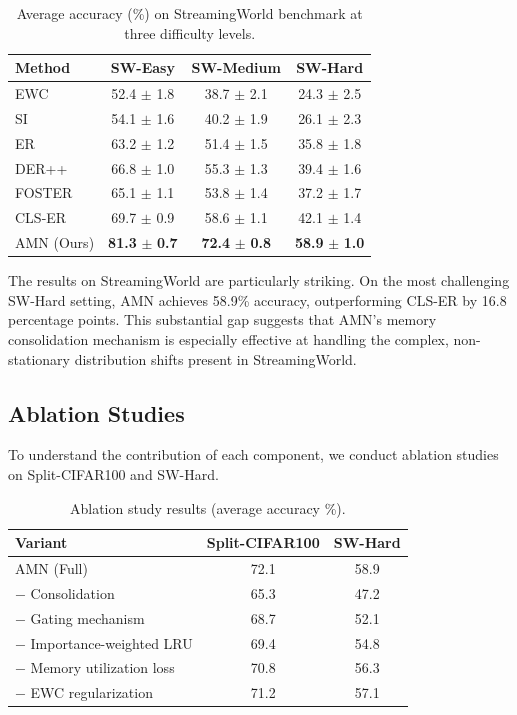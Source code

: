 \documentclass[11pt]{article}
\begin{document}
\begin{table}[h]
\centering
\caption{Average accuracy (\%) on StreamingWorld benchmark at three difficulty levels.}
\label{tab:streaming}
\begin{tabular}{lccc}
\hline
Method & SW-Easy & SW-Medium & SW-Hard \\
\hline
EWC & 52.4 $\pm$ 1.8 & 38.7 $\pm$ 2.1 & 24.3 $\pm$ 2.5 \\
SI & 54.1 $\pm$ 1.6 & 40.2 $\pm$ 1.9 & 26.1 $\pm$ 2.3 \\
ER & 63.2 $\pm$ 1.2 & 51.4 $\pm$ 1.5 & 35.8 $\pm$ 1.8 \\
DER++ & 66.8 $\pm$ 1.0 & 55.3 $\pm$ 1.3 & 39.4 $\pm$ 1.6 \\
FOSTER & 65.1 $\pm$ 1.1 & 53.8 $\pm$ 1.4 & 37.2 $\pm$ 1.7 \\
CLS-ER & 69.7 $\pm$ 0.9 & 58.6 $\pm$ 1.1 & 42.1 $\pm$ 1.4 \\
\hline
AMN (Ours) & \textbf{81.3} $\pm$ \textbf{0.7} & \textbf{72.4} $\pm$ \textbf{0.8} & \textbf{58.9} $\pm$ \textbf{1.0} \\
\hline
\end{tabular}
\end{table}

The results on StreamingWorld are particularly striking. On the most challenging SW-Hard setting, AMN achieves 58.9\% accuracy, outperforming CLS-ER by 16.8 percentage points. This substantial gap suggests that AMN's memory consolidation mechanism is especially effective at handling the complex, non-stationary distribution shifts present in StreamingWorld.

\subsection{Ablation Studies}

To understand the contribution of each component, we conduct ablation studies on Split-CIFAR100 and SW-Hard.

\begin{table}[h]
\centering
\caption{Ablation study results (average accuracy \%).}
\label{tab:ablation}
\begin{tabular}{lcc}
\hline
Variant & Split-CIFAR100 & SW-Hard \\
\hline
AMN (Full) & 72.1 & 58.9 \\
$-$ Consolidation & 65.3 & 47.2 \\
$-$ Gating mechanism & 68.7 & 52.1 \\
$-$ Importance-weighted LRU & 69.4 & 54.8 \\
$-$ Memory utilization loss & 70.8 & 56.3 \\
$-$ EWC regularization & 71.2 & 57.1 \\
\hline
\end{tabular}
\end{table}
\end{document}

